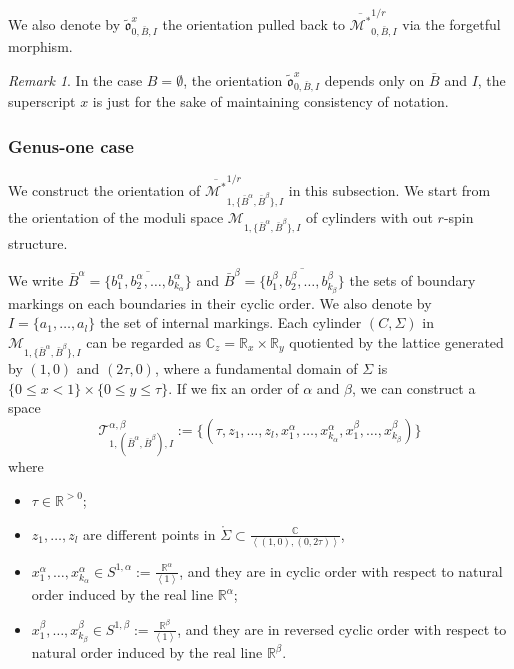 \documentclass[11pt,a4paper]{article}
\theoremstyle{definition}
\theoremstyle{remark}
\newtheorem{rmk}[dummy]{Remark}
\numberwithin{equation}{section}
\def\Mbarstar{{\overline{\mathcal M^*}}}
\begin{document}
We also denote by $\tilde{\mathfrak o}^{x}_{0,\bar{B},I}$ the orientation pulled back to $\Mbarstar^{1/r}_{0,\bar{B},I}$ via the forgetful morphism.
\begin{rmk}
    In the case $B=\emptyset$, the orientation $\tilde{\mathfrak o}^{x}_{0,\bar{B},I}$ depends only on $\bar{B}$ and $I$, the superscript $x$ is just for the sake of maintaining consistency of notation.
\end{rmk}

  
\subsubsection{Genus-one case} \label{sec orientation for moduli g=1}

We construct the orientation of $\Mbarstar^{1/r}_{1,\{\bar{B}^\alpha,\bar{B}^\beta\},I}$ in this subsection. We start from the orientation of the moduli space  $\mathcal M_{1,\{\bar B^{\alpha}, \bar B^\beta\},I}$ of cylinders with out $r$-spin structure.

We write $\bar B^\alpha=\overline{\{b^\alpha_1,b^\alpha_2,\dots,b^\alpha_{k_\alpha}\}}$ and $\bar B^\beta=\overline{\{b^\beta_1,b^\beta_2,\dots,b^\beta_{k_\beta}\}}$ the sets of boundary markings on each boundaries in their cyclic order. We also denote by $I=\{a_1,\dots,a_l\}$ the set of internal markings. Each cylinder $(C,\Sigma)$ in $\mathcal M_{1,\{\bar B^{\alpha}, \bar B^\beta\},I}$ can be regarded as $\mathbb C_z=\mathbb R_x \times \mathbb R_y$ quotiented by the lattice generated by $(1,0)$ and $(2\tau,0)$, where a fundamental domain of $\Sigma$ is $\{0\le x <1\}\times \{0\le y \le \tau\}$. If we fix an order of $\alpha$ and $\beta$, we can construct a space
$$
\mathcal T^{\alpha,\beta}_{1,(\bar{B}^\alpha,\bar{B}^\beta),I}:=\{(\tau,z_1,\dots,z_l,x^\alpha_1,\dots,x^\alpha_{k_\alpha},x^\beta_1,\dots,x^\beta_{k_\beta})\}
$$
where
\begin{itemize}
    \item $\tau \in \mathbb R^{>0}$;
    \item $z_1,\dots,z_l$ are different points in $\mathring{\Sigma}\subset \frac{\mathbb C}{\left<(1,0),(0,2\tau)\right>}$,
    \item $x^\alpha_1,\dots,x^\alpha_{k_\alpha}\in S^{1,\alpha}:=\frac{\mathbb R^\alpha}{\left<1\right>}$, and they are in cyclic order with respect to natural order induced by the real line $\mathbb R^\alpha$;
     \item $x^\beta_1,\dots,x^\beta_{k_\beta}\in S^{1,\beta}:=\frac{\mathbb R^\beta}{\left<1\right>}$, and they are in reversed cyclic order with respect to natural order induced by the real line $\mathbb R^\beta$.
\end{itemize}
\end{document}

